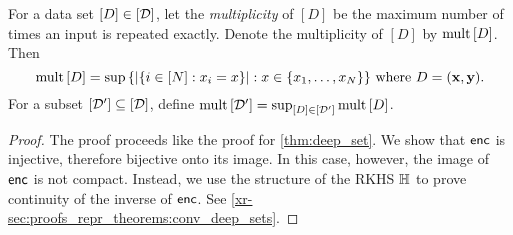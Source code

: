 \documentclass[12pt, twoside]{report}
\newcommand{\xrprefix}[1]{xr-#1}
\begin{document}
\begin{definition}
    For a data set $[D] \in [\mathcal{D}]$, let the \emph{multiplicity} of $[D]$ be the maximum number of times an input is repeated exactly.
    Denote the multiplicity of $[D]$ by $\operatorname{mult}\,[D]$.
    Then
    \begin{equation}
        \operatorname{mult}\,[D]
        = \operatorname*{sup}\, \{\lvert\{i \in [N]: x_i = x\}\rvert :  x \in \{x_1, \ldots, x_{N}\}\}
        \text{ where } D = (\mathbf{x}, \mathbf{y}).
    \end{equation}
    For a subset $[\mathcal{D}'] \subseteq [\mathcal{D}]$, define $\operatorname{mult}\,[\mathcal{D}'] = \operatorname*{sup}_{[D] \in [\mathcal{D}']} \operatorname{mult}\,[D]$.
\end{definition}

\begin{proof}
    The proof proceeds like the proof for \cref{thm:deep_set}.
    We show that $\mathsf{enc}$ is injective, therefore bijective onto its image.
    In this case, however, the image of $\mathsf{enc}$ is not compact. 
    Instead, we use the structure of the RKHS $\mathbb{H}$ to prove continuity of the inverse of $\mathsf{enc}$.
    See \cref{\xrprefix{sec:proofs_repr_theorems:conv_deep_sets}}.
\end{proof}
\end{document}
